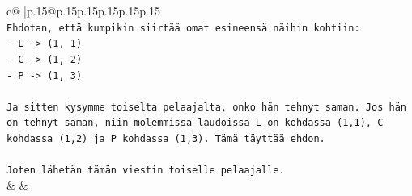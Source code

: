 \documentclass{article}
\begin{document}
{\begin{supertabular}{c@{$\;$}|p{.15\linewidth}@{}p{.15\linewidth}p{.15\linewidth}p{.15\linewidth}p{.15\linewidth}p{.15\linewidth}}
{{{\\ 
\texttt{Ehdotan, että kumpikin siirtää omat esineensä näihin kohtiin:} \\
\texttt{{-} L {-}> (1, 1)} \\
\texttt{{-} C {-}> (1, 2)} \\
\texttt{{-} P {-}> (1, 3)} \\
\\ 
\texttt{Ja sitten kysymme toiselta pelaajalta, onko hän tehnyt saman. Jos hän on tehnyt saman, niin molemmissa laudoissa L on kohdassa (1,1), C kohdassa (1,2) ja P kohdassa (1,3). Tämä täyttää ehdon.} \\
\\ 
\texttt{Joten lähetän tämän viestin toiselle pelaajalle.} \\
            }
        }
    }
    & & \\ \\


\end{supertabular}}
\end{document}
